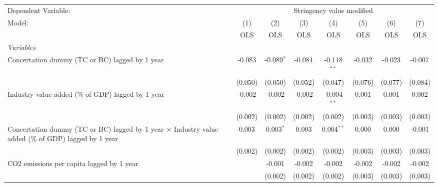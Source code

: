 
\begingroup
\centering
\begin{tabular}{lccccccc}
   \toprule
   Dependent Variable: & \multicolumn{7}{c}{Stringency value modified}\\
   Model:                                                                                                      & (1)     & (2)          & (3)     & (4)           & (5)     & (6)     & (7)\\  
                                                                                                               &  OLS    & OLS          & OLS     & OLS           & OLS     & OLS     & OLS\\  
   \midrule
   \emph{Variables}\\
   Concertation dummy (TC or BC) lagged by 1 year                                                              & -0.083  & -0.089$^{*}$ & -0.084  & -0.118$^{**}$ & -0.032  & -0.023  & -0.007\\   
                                                                                                               & (0.050) & (0.050)      & (0.052) & (0.047)       & (0.076) & (0.077) & (0.084)\\   
   Industry value added (\% of GDP) lagged by 1 year                                                           & -0.002  & -0.002       & -0.002  & -0.004$^{**}$ & 0.001   & 0.001   & 0.002\\   
                                                                                                               & (0.002) & (0.002)      & (0.002) & (0.002)       & (0.003) & (0.003) & (0.003)\\   
   Concertation dummy (TC or BC) lagged by 1 year $\times$ Industry value added (\% of GDP) lagged by 1 year   & 0.003   & 0.003$^{*}$  & 0.003   & 0.004$^{**}$  & 0.000   & 0.000   & -0.001\\   
                                                                                                               & (0.002) & (0.002)      & (0.002) & (0.002)       & (0.003) & (0.003) & (0.003)\\   
   CO2 emissions per capita lagged by 1 year                                                                   &         & -0.001       & -0.002  & -0.002        & -0.002  & -0.002  & -0.002\\   
                                                                                                               &         & (0.002)      & (0.002) & (0.002)       & (0.003) & (0.003) & (0.003)\\   

\end{tabular}
